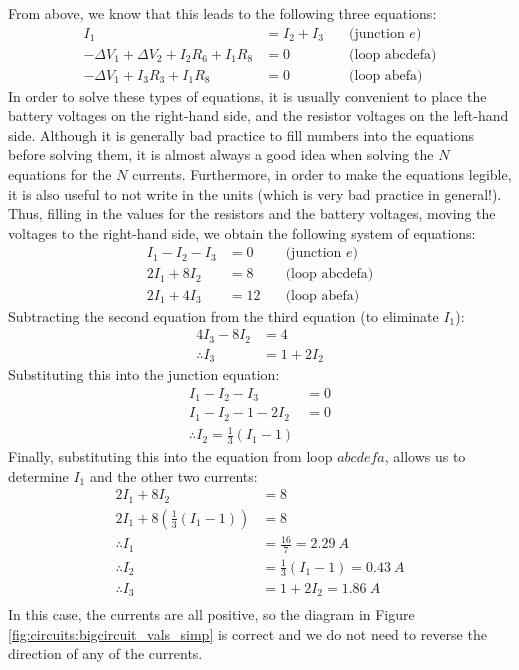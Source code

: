 \begin{example}
From above, we know that this leads to the following three equations:
\begin{align*}
I_1 &= I_2+I_3 \quad &\text{(junction $e$)}\\
-\Delta V_1+\Delta V_2+I_2R_6+I_1R_8&=0\quad&\text{(loop abcdefa)}\\
-\Delta V_1+I_3R_3+I_1R_8&=0\quad&\text{(loop abefa)}
\end{align*}
In order to solve these types of equations, it is usually convenient to place the battery voltages on the right-hand side, and the resistor voltages on the left-hand side. Although it is generally bad practice to fill numbers into the equations before solving them, it is almost always a good idea when solving the $N$ equations for the $N$ currents. Furthermore, in order to make the equations legible, it is also useful to not write in the units (which is very bad practice in general!). Thus, filling in the values for the resistors and the battery voltages, moving the voltages to the right-hand side, we obtain the following system of equations:
\begin{align*}
I_1-I_2-I_3&=0  \quad &\text{(junction $e$)}\\
2I_1+8I_2&=8 \quad&\text{(loop abcdefa)}\\
2I_1+4I_3&=12 \quad&\text{(loop abefa)}
\end{align*}
Subtracting the second equation from the third equation (to eliminate $I_1$):
\begin{align*}
4I_3-8I_2&=4\\
\therefore I_3&=1+2I_2
\end{align*}
Substituting this into the junction equation:
\begin{align*}
I_1-I_2-I_3&=0\\
I_1-I_2-1-2I_2&=0\\
\therefore I_2=\frac{1}{3}(I_1-1)
\end{align*}
Finally, substituting this into the equation from loop $abcdefa$, allows us to determine $I_1$ and the other two currents:
\begin{align*}
2I_1+8I_2&=8\\
2I_1+8\left(\frac{1}{3}(I_1-1) \right)&=8\\
\therefore I_1&=\frac{16}{7}=\SI{2.29}{A}\\
\therefore I_2&=\frac{1}{3}(I_1-1)=\SI{0.43}{A}\\
\therefore I_3&=1+2I_2=\SI{1.86}{A}\\
\end{align*}
In this case, the currents are all positive, so the diagram in Figure \ref{fig:circuits:bigcircuit_vals_simp} is correct and we do not need to reverse the direction of any of the currents. 


\end{example}
